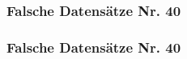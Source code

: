 \begin{frame}
  \frametitle{Falsche Datensätze \hfill Nr. 40}
\end{frame}

\begin{frame}
  \frametitle{Falsche Datensätze \hfill Nr. 40}
\end{frame}



